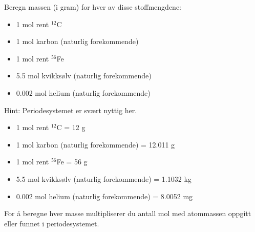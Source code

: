 

Beregn massen (i gram) for hver av disse stoffmengdene:

\begin{itemize}
\item{} 1 mol rent $^{12}$C
\vskip 5pt
\item{} 1 mol karbon (naturlig forekommende)
\vskip 5pt
\item{} 1 mol rent $^{56}$Fe
\vskip 5pt
\item{} 5.5 mol kvikksølv (naturlig forekommende)
\vskip 5pt
\item{} 0.002 mol helium (naturlig forekommende)
\end{itemize} 

Hint: Periodesystemet er svært nyttig her.







\begin{itemize} 
\item{} 1 mol rent $^{12}$C = 12 g
\vskip 5pt
\item{} 1 mol karbon (naturlig forekommende) = 12.011 g
\vskip 5pt
\item{} 1 mol rent $^{56}$Fe = 56 g
\vskip 5pt
\item{} 5.5 mol kvikksølv (naturlig forekommende) = 1.1032 kg
\vskip 5pt
\item{} 0.002 mol helium (naturlig forekommende) = 8.0052 mg
\end{itemize} 

\vskip 10pt

For å beregne hver masse multipliserer du antall mol med atommassen oppgitt eller funnet i periodesystemet.











